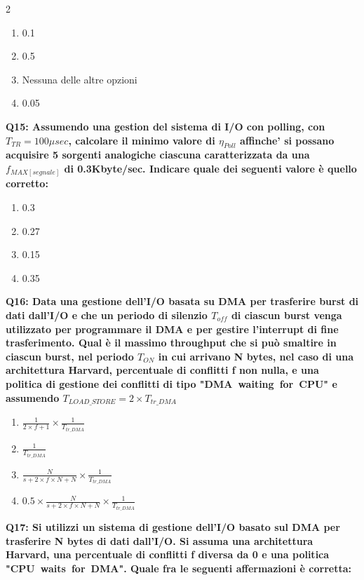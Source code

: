 \documentclass[10pt]{article}
\begin{document}
\begin{multicols}{2}
\begin{enumerate}[label=\arabic*.]
\item 0.1
\item 0.5
\item Nessuna delle altre opzioni
\item 0.05
\end{enumerate}
\textbf{Q15: Assumendo una gestion del sistema di I/O con polling, con $T_{TR}=100\mu sec$, calcolare il minimo valore di $\eta_{Poll}$ affinche' si possano acquisire 5 sorgenti analogiche ciascuna caratterizzata da una $f_{MAX[segnale]}$ di 0.3Kbyte/sec.  Indicare quale dei seguenti valore è quello corretto:}

\begin{enumerate}[label=\arabic*.]
\item 0.3
\item 0.27
\item 0.15
\item 0.35
\end{enumerate}
\textbf{Q16: Data una gestione dell’I/O basata su DMA per trasferire burst di dati dall’I/O e che un periodo di silenzio $T_{off}$ di ciascun burst venga utilizzato per programmare il DMA e per gestire l’interrupt di fine trasferimento. Qual è il massimo throughput che si può smaltire in ciascun burst, nel periodo $T_{ON}$ in cui arrivano N bytes, nel caso di una architettura Harvard, percentuale di conflitti f non nulla, e una politica di gestione dei conflitti di tipo "DMA waiting for CPU" e assumendo $T_{LOAD\_STORE} = 2 \times T_{tr\_DMA}$}

\begin{enumerate}[label=\arabic*.]
\item $\frac{1}{ 2 \times f + 1} \times \frac{1}{T_{tr\_DMA}} $
\item $\frac{1}{T_{tr\_DMA}}$
\item $\frac{N}{s+ 2 \times f \times N + N} \times \frac{1}{T_{tr\_DMA}} $
\item $0.5 \times \frac{N}{s+ 2 \times f \times N + N} \times \frac{1}{T_{tr\_DMA}} $
\end{enumerate}
\textbf{Q17: Si utilizzi un sistema di gestione dell’I/O basato sul DMA per trasferire N bytes di dati dall’I/O. Si assuma una architettura Harvard, una percentuale di conflitti f diversa da 0 e una politica "CPU waits for DMA". Quale fra le seguenti affermazioni è corretta:}


\end{multicols}
\end{document}
